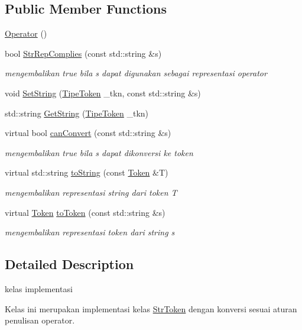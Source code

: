 \subsection*{Public Member Functions}
\begin{DoxyCompactItemize}
\item 
\hyperlink{class_operator_acf2514c5e9f48b0a988c955a7d41c486}{Operator} ()
\item 
bool \hyperlink{class_operator_a1b88904a14779cfc05d2337fb2104ab7}{Str\-Rep\-Complies} (const std\-::string \&s)
\begin{DoxyCompactList}\small\item\em mengembalikan true bila s dapat digunakan sebagai representasi operator \end{DoxyCompactList}\item 
void \hyperlink{class_operator_a74ea7dd97fd540327028b19fd84badc9}{Set\-String} (\hyperlink{_token_8h_a29ea73031d51befacf649fa6af865e30}{Tipe\-Token} \-\_\-tkn, const std\-::string \&s)
\item 
std\-::string \hyperlink{class_operator_aad8b367d21ec5508d0ae10ca59adca73}{Get\-String} (\hyperlink{_token_8h_a29ea73031d51befacf649fa6af865e30}{Tipe\-Token} \-\_\-tkn)
\item 
virtual bool \hyperlink{class_operator_a45e663ede5c21432e883db8504b81f86}{can\-Convert} (const std\-::string \&s)
\begin{DoxyCompactList}\small\item\em mengembalikan true bila s dapat dikonversi ke token \end{DoxyCompactList}\item 
virtual std\-::string \hyperlink{class_operator_a1e41cc6d646b1703c7858282cbcf350f}{to\-String} (const \hyperlink{class_token}{Token} \&T)
\begin{DoxyCompactList}\small\item\em mengembalikan representasi string dari token T \end{DoxyCompactList}\item 
virtual \hyperlink{class_token}{Token} \hyperlink{class_operator_a7059095d7977dbdda3068f506b6ed70a}{to\-Token} (const std\-::string \&s)
\begin{DoxyCompactList}\small\item\em mengembalikan representasi token dari string s \end{DoxyCompactList}\end{DoxyCompactItemize}


\subsection{Detailed Description}
kelas implementasi\par
Kelas ini merupakan implementasi kelas \hyperlink{class_str_token}{Str\-Token} dengan konversi sesuai aturan penulisan operator. 

